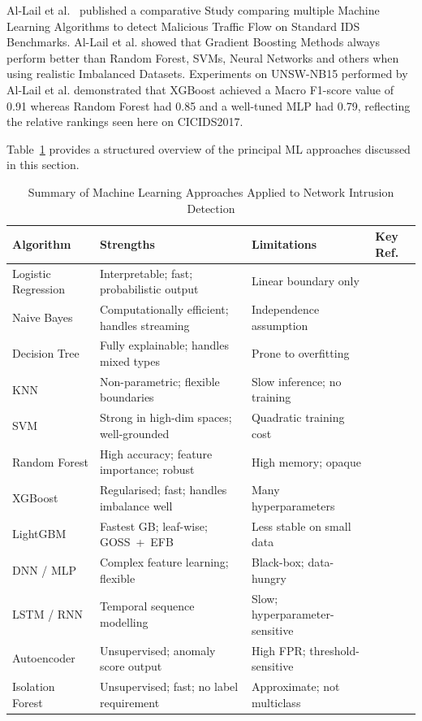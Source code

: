 Al-Lail et al.~\cite{allail2023ml} published a comparative Study comparing multiple Machine Learning Algorithms to detect Malicious Traffic Flow on Standard IDS Benchmarks. Al-Lail et al. showed that Gradient Boosting Methods always perform better than Random Forest, SVMs, Neural Networks and others when using realistic Imbalanced Datasets. Experiments on UNSW-NB15 performed by Al-Lail et al. demonstrated that XGBoost achieved a Macro F1-score value of 0.91 whereas Random Forest had 0.85 and a well-tuned MLP had 0.79, reflecting the relative rankings seen here on CICIDS2017.

Table~\ref{tab:ml_summary} provides a structured overview of the principal ML approaches discussed in this section.

\begin{table}[H]
\centering
\caption{Summary of Machine Learning Approaches Applied to Network Intrusion Detection}
\label{tab:ml_summary}
\begin{tabular}{lp{3.6cm}p{3.6cm}l}
\toprule
\textbf{Algorithm} & \textbf{Strengths} & \textbf{Limitations} & \textbf{Key Ref.} \\
\midrule
Logistic Regression & Interpretable; fast; probabilistic output & Linear boundary only & \cite{buczak2016survey} \\
Naive Bayes         & Computationally efficient; handles streaming & Independence assumption & \cite{buczak2016survey} \\
Decision Tree       & Fully explainable; handles mixed types & Prone to overfitting & \cite{buczak2016survey} \\
KNN                 & Non-parametric; flexible boundaries & Slow inference; no training & \cite{buczak2016survey} \\
SVM                 & Strong in high-dim spaces; well-grounded & Quadratic training cost & \cite{buczak2016survey} \\
Random Forest       & High accuracy; feature importance; robust & High memory; opaque & \cite{tavallaee2009nslkdd} \\
XGBoost             & Regularised; fast; handles imbalance well & Many hyperparameters & \cite{allail2023ml} \\
LightGBM            & Fastest GB; leaf-wise; GOSS~+~EFB & Less stable on small data & \cite{nordin2024aireview} \\
DNN / MLP           & Complex feature learning; flexible & Black-box; data-hungry & \cite{javaid2016deep} \\
LSTM / RNN          & Temporal sequence modelling & Slow; hyperparameter-sensitive & \cite{yin2017rnn} \\
Autoencoder         & Unsupervised; anomaly score output & High FPR; threshold-sensitive & \cite{shone2018deep} \\
Isolation Forest    & Unsupervised; fast; no label requirement & Approximate; not multiclass & \cite{khraisat2019survey} \\
\bottomrule
\end{tabular}
\end{table}

